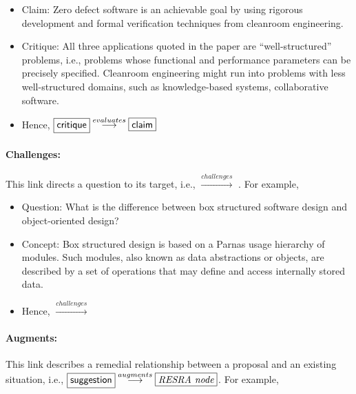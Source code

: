 \small
\begin{itemize}
\item {\sf Claim:} Zero defect software is an achievable goal by using
  rigorous development and formal verification techniques from cleanroom
  engineering.
  
\item {\sf Critique:\/} All three applications quoted in the paper are
``well-structured'' problems, i.e., problems whose functional and
performance parameters can be precisely specified. Cleanroom
engineering might run into problems with less well-structured domains, such
as knowledge-based systems, collaborative software.

\item Hence, \( \fbox{{\sf critique}} \stackrel{evaluates}{\longrightarrow}
\fbox{{\sf claim}} \)
\end{itemize}
\normalsize

\paragraph{Challenges:}

This link directs a question to its target, i.e.,  \(
\stackrel{challenges}{\longrightarrow} \) . For
example,

\small
\begin{itemize}
\item {\sf Question:} What is the difference between box structured
  software design and object-oriented design?
  
\item {\sf Concept:\/} Box structured design is based on a Parnas usage
  hierarchy of modules. Such modules, also known as data abstractions or
  objects, are described by a set of operations that may define and access
  internally stored data.
  
\item Hence,  \(
  \stackrel{challenges}{\longrightarrow} \) 
\end{itemize}
\normalsize


\paragraph{Augments:}

This link describes a remedial relationship between a proposal and an
existing situation, i.e., \( \fbox{{\sf suggestion}}
\stackrel{augments}{\longrightarrow} \fbox{{\it RESRA node}} \). For
example,

